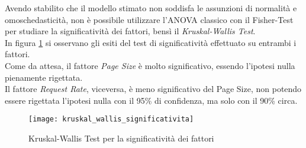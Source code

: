 Avendo stabilito che il modello stimato non soddisfa le assunzioni di normalità e
omoschedasticità, non è possibile utilizzare l'ANOVA classico con il Fisher-Test
per studiare la significatività dei fattori, bensì il \textit{Kruskal-Wallis Test}.\\

In figura \ref{webserver_kruskal_wallis_significativita} si osservano gli esiti del test
di significatività effettuato su entrambi i fattori.\\
Come da attesa, il fattore \textit{Page Size} è molto significativo,
essendo l'ipotesi nulla pienamente rigettata.\\
Il fattore \textit{Request Rate}, viceversa, è meno significativo
del Page Size, non potendo essere rigettata l'ipotesi nulla con il 95\% di
confidenza, ma solo con il 90\% circa.\\

\begin{figure}[!htbp]
  \centering
  \texttt{[image: kruskal\_wallis\_significativita]}
  \caption{Kruskal-Wallis Test per la significatività dei fattori}
  \label{webserver_kruskal_wallis_significativita}
\end{figure}
